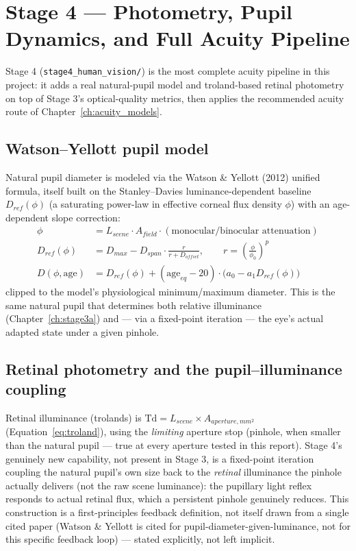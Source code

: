 \chapter{Stage 4 --- Photometry, Pupil Dynamics, and Full Acuity Pipeline}
\label{ch:stage4}

Stage 4 (\texttt{stage4\_human\_vision/}) is the most complete acuity pipeline in this
project: it adds a real natural-pupil model and troland-based retinal photometry on
top of Stage 3's optical-quality metrics, then applies the recommended acuity route of
Chapter~\ref{ch:acuity_models}.

\section{Watson--Yellott pupil model}

Natural pupil diameter is modeled via the Watson \& Yellott (2012) unified formula,
itself built on the Stanley--Davies luminance-dependent baseline
$D_{ref}(\phi)$ (a saturating power-law in effective corneal flux density $\phi$) with
an age-dependent slope correction:
\begin{align}
\phi &= L_{scene}\cdot A_{field}\cdot(\text{monocular/binocular attenuation}) \\
D_{ref}(\phi) &= D_{max} - D_{span}\cdot\frac{r}{r+D_{offset}}, \qquad r=\left(\frac{\phi}{\phi_0}\right)^{p} \\
D(\phi, \text{age}) &= D_{ref}(\phi) + (\text{age}_{eq}-20)\cdot\big(a_0 - a_1 D_{ref}(\phi)\big)
\end{align}
clipped to the model's physiological minimum/maximum diameter. This is the same
natural pupil that determines both relative illuminance (Chapter~\ref{ch:stage3a}) and
--- via a fixed-point iteration --- the eye's actual adapted state under a given
pinhole.

\section{Retinal photometry and the pupil--illuminance coupling}

Retinal illuminance (trolands) is $\text{Td}=L_{scene}\times A_{aperture,mm^2}$
(Equation~\ref{eq:troland}), using the \emph{limiting} aperture stop (pinhole, when
smaller than the natural pupil --- true at every aperture tested in this report). Stage
4's genuinely new capability, not present in Stage 3, is a fixed-point iteration
coupling the natural pupil's own size back to the \emph{retinal} illuminance the
pinhole actually delivers (not the raw scene luminance): the pupillary light reflex
responds to actual retinal flux, which a persistent pinhole genuinely reduces. This
construction is a first-principles feedback definition, not itself drawn from a single
cited paper (Watson \& Yellott is cited for pupil-diameter-given-luminance, not for
this specific feedback loop) --- stated explicitly, not left implicit.

